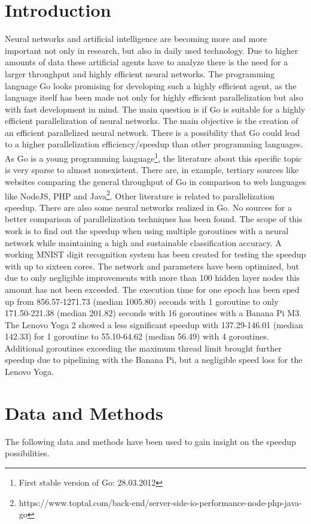 \documentclass[11pt]{article}
\begin{document}
\section{Introduction}
Neural networks and artificial intelligence are becoming more and more important not only in research, but also in daily used technology. Due to higher amounts of data these artificial agents have to analyze there is the need for a larger throughput and highly efficient neural networks. The programming language Go looks promising for developing such a highly efficient agent, as the language itself has been made not only for highly efficient parallelization but also with fast development in mind.
The main question is if Go is suitable for a highly efficient parallelization of neural networks.
The main objective is the creation of an efficient parallelized neural network. There is a possibility that Go could lead to a higher parallelization efficiency/speedup than other programming languages.
As Go is a young programming language\footnote{First stable version of Go: 28.03.2012\cite{GoRelease}}, the literature about this specific topic is very sparse to almost nonexistent. There are, in example, tertiary sources like websites comparing the general throughput of Go in comparison to web languages like NodeJS, PHP and Java\footnote{https://www.toptal.com/back-end/server-side-io-performance-node-php-java-go}. Other literature is related to parallelization speedup. There are also some neural networks realized in Go. No sources for a better comparison of parallelization techniques has been found.
The scope of this work is to find out the speedup when using multiple goroutines with a neural network while maintaining a high and sustainable classification accuracy. A working MNIST digit recognition system has been created for testing the speedup with up to sixteen cores. The network and parameters have been optimized, but due to only negligible improvements with more than 100 hidden layer nodes this amount has not been exceeded.
The execution time for one epoch has been sped up from 856.57-1271.73 (median 1005.80) seconds with 1 goroutine to only 171.50-221.38 (median 201.82) seconds with 16 goroutines with a Banana Pi M3. The Lenovo Yoga 2 showed a less significant speedup with 137.29-146.01 (median 142.33) for 1 goroutine to 55.10-64.62 (median 56.49) with 4 goroutines. Additional goroutines exceeding the maximum thread limit brought further speedup due to pipelining with the Banana Pi, but a negligible speed loss for the Lenovo Yoga.

\section{Data and Methods}
The following data and methods have been used to gain insight on the speedup possibilities.
\end{document}
